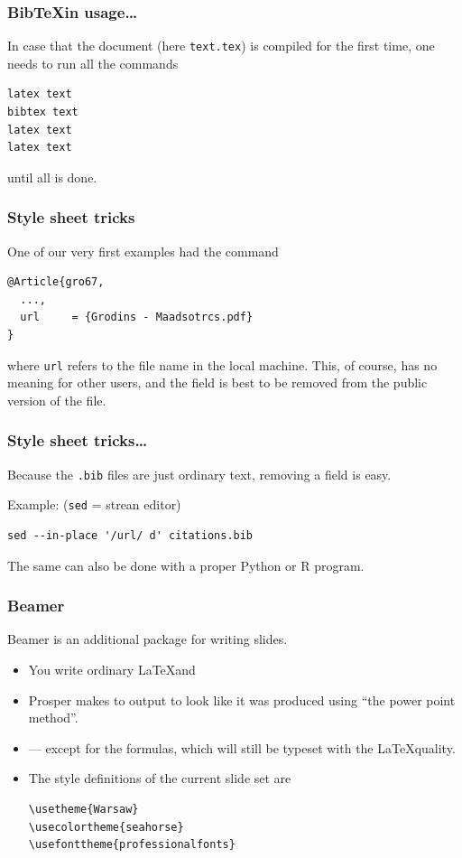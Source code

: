 \documentclass[13pt]{beamer}
\begin{document}
\begin{frame}[fragile]\frametitle{BibTeXin usage\dots}
In case that the document (here \verb|text.tex|) is compiled for the first time,
one needs to run all the commands
\begin{verbatim}
latex text 
bibtex text 
latex text 
latex text 
\end{verbatim}
until all is done.
\end{frame}

\begin{frame}[fragile]\frametitle{Style sheet tricks}
One of our very first examples had the command
\begin{verbatim}
@Article{gro67,
  ...,
  url     = {Grodins - Maadsotrcs.pdf}
}
\end{verbatim}
\begin{flushleft}
where \texttt{url} refers to the file name in the local machine. This, of
course, has no meaning for other users, and the field is best to be removed from
the public version of the file.
\end{flushleft}
\end{frame}


\begin{frame}[fragile]\frametitle{Style sheet tricks\dots} 
Because the \texttt{.bib} files are just ordinary text, removing a field is
easy.\medskip

Example: (\texttt{sed} = strean editor)
\begin{verbatim}
sed --in-place '/url/ d' citations.bib
\end{verbatim}
The same can also be done with a proper Python or R program.
\end{frame}


\begin{frame}[fragile]\frametitle{Beamer}
Beamer is an additional package for writing slides.
\begin{itemize}
\item You write ordinary \LaTeX and
\item Prosper makes to output to look like it was produced using ``the power
point method''.
\item --- except for the formulas, which will still be typeset with the  
\LaTeX quality.
\item The style definitions of the current slide set are 
\begin{verbatim}
\usetheme{Warsaw}
\usecolortheme{seahorse}
\usefonttheme{professionalfonts}
\end{verbatim}
\end{itemize}
\end{frame}
\end{document}
